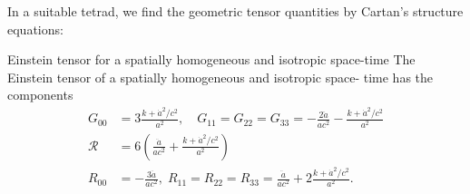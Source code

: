 In a suitable tetrad, we find the geometric tensor quantities by Cartan's structure equations:
\begin{mybox}{Einstein tensor for a spatially homogeneous and isotropic
		space-time}
	The Einstein tensor of a spatially homogeneous and isotropic space-
	time has the components
	\begin{align}
		G_{00}&= 3\frac{k+\dot{a}^2/c^2}{a^2}, \quad G_{11}=G_{22}=G_{33} =-\frac{2 \ddot{a}}{a c^2}- \frac{k+\dot{a}^2/c^2}{a^2} \\
		\mathcal{R} &= 6 \left(\frac{\ddot{a}}{a c^2} + \frac{k+\dot{a}^2/c^2}{a^2}\right)\\
		R_{00}& =- \frac{3 \ddot{a}}{a c^2}, \; R_{11}=R_{22}=R_{33}=\frac{\ddot{a}}{a c^2} + 2\frac{k+\dot{a}^2/c^2}{a^2}.
	\end{align}
\end{mybox}
